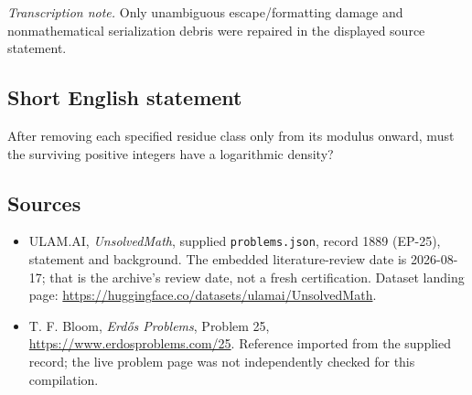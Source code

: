 \documentclass[11pt,a4paper]{article}
\begin{document}
{\small\emph{Transcription note.} Only unambiguous escape/formatting damage and nonmathematical serialization debris were repaired in the displayed source statement.}

\subsection{Short English statement}

After removing each specified residue class only from its modulus onward, must the surviving positive integers have a logarithmic density?

\subsection{Sources}

{\small

\begin{itemize}

\item[\hypertarget{source:1889:1}{S1}] ULAM.AI, \emph{UnsolvedMath}, supplied \texttt{problems.json}, record 1889 (EP-25), statement and background. The embedded literature-review date is 2026-08-17; that is the archive’s review date, not a fresh certification. Dataset landing page: \url{https://huggingface.co/datasets/ulamai/UnsolvedMath}.

\item[\hypertarget{source:1889:2}{S2}] T. F. Bloom, \emph{Erdős Problems}, Problem 25, \url{https://www.erdosproblems.com/25}. Reference imported from the supplied record; the live problem page was not independently checked for this compilation.

\end{itemize}

}

\label{end:1889}
\end{document}

